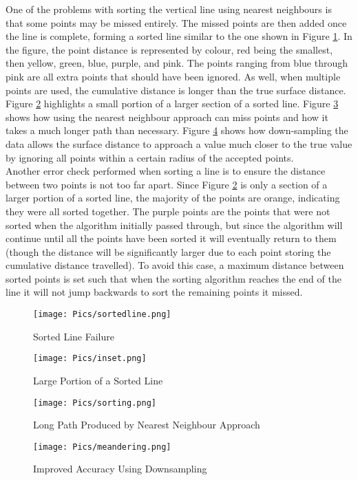 One of the problems with sorting the vertical line using nearest neighbours is that some points may be missed entirely. The missed points are then added once the line is complete, forming a sorted line similar to the one shown in Figure \ref{fig:sline}. In the figure, the point distance is represented by colour, red being the smallest, then yellow, green, blue, purple, and pink. The points ranging from blue through pink are all extra points that should have been ignored. As well, when multiple points are used, the cumulative distance is longer than the true surface distance. Figure \ref{fig:inset} highlights a small portion of a larger section of a sorted line. Figure \ref{fig:meandering} shows how using the nearest neighbour approach can miss points and how it takes a much longer path than necessary. Figure \ref{fig:downsampledpath} shows how down-sampling the data allows the surface distance to approach a value much closer to the true value by ignoring all points within a certain radius of the accepted points. \\

Another error check performed when sorting a line is to ensure the distance between two points is not too far apart. Since Figure \ref{fig:inset} is only a section of a larger portion of a sorted line, the majority of the points are orange, indicating they were all sorted together. The purple points are the points that were not sorted when the algorithm initially passed through, but since the algorithm will continue until all the points have been sorted it will eventually return to them (though the distance will be significantly larger due to each point storing the cumulative distance travelled). To avoid this case, a maximum distance between sorted points is set such that when the sorting algorithm reaches the end of the line it will not jump backwards to sort the remaining points it missed.\\

\begin{figure}[H]
    \centering
    \texttt{[image: Pics/sortedline.png]}
    \caption{Sorted Line Failure}
    \label{fig:sline}
\end{figure}
\begin{figure}[H]
    \centering
    \texttt{[image: Pics/inset.png]}
    \caption{Large Portion of a Sorted Line}
    \label{fig:inset}
\end{figure}
\begin{figure}[H]
    \centering
    \texttt{[image: Pics/sorting.png]}
    \caption{Long Path Produced by Nearest Neighbour Approach}
    \label{fig:meandering}
\end{figure}
\begin{figure}[H]
    \centering
    \texttt{[image: Pics/meandering.png]}
    \caption{Improved Accuracy Using Downsampling}
    \label{fig:downsampledpath}
\end{figure}

